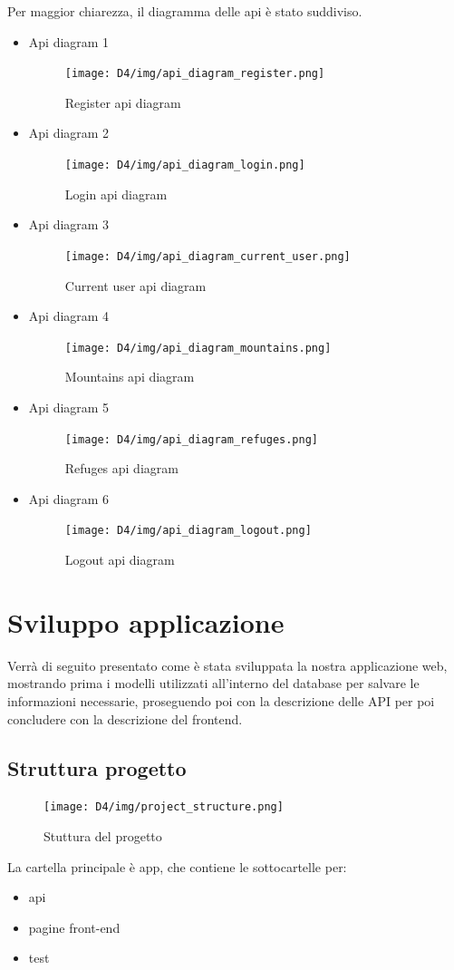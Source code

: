 \documentclass[a4paper,12pt]{article}
\begin{document}
Per maggior chiarezza, il diagramma delle api è stato suddiviso.
\begin{itemize}
    \item Api diagram 1
    \begin{figure}[H]
    \centering
   \texttt{[image: D4/img/api\_diagram\_register.png]}
    \caption{Register api diagram}
    \end{figure}
    
    \item Api diagram 2
    \begin{figure}[H]
   \centering
   \texttt{[image: D4/img/api\_diagram\_login.png]}
    \caption{Login api diagram}
\end{figure}

    \item Api diagram 3
        \begin{figure}[H]
       \centering
       \texttt{[image: D4/img/api\_diagram\_current\_user.png]}
        \caption{Current user api diagram}
    \end{figure}

    \item Api diagram 4
    \begin{figure}[H]
    \centering
   \texttt{[image: D4/img/api\_diagram\_mountains.png]}
    \caption{Mountains api diagram}
\end{figure}
    \item Api diagram 5
    \begin{figure}[H]
   \centering
   \texttt{[image: D4/img/api\_diagram\_refuges.png]}
    \caption{Refuges api diagram}
\end{figure}
    \item Api diagram 6
    \begin{figure}[H]
   \centering
   \texttt{[image: D4/img/api\_diagram\_logout.png]}
    \caption{Logout api diagram}
\end{figure}
\end{itemize}

\newpage
\section{Sviluppo applicazione}
Verrà di seguito presentato come è stata sviluppata la nostra applicazione web, mostrando prima i modelli utilizzati all'interno del database per salvare le informazioni necessarie, proseguendo poi con la descrizione delle API per poi concludere con la descrizione del frontend.

\subsection{Struttura progetto}
\begin{figure}[H]
   \centering
   \texttt{[image: D4/img/project\_structure.png]}
    \caption{Stuttura del progetto}
\end{figure}
La cartella principale è app, che contiene le sottocartelle per:
\begin{itemize}
    \item api
    \item pagine front-end
    \item test
\end{itemize}
\end{document}

